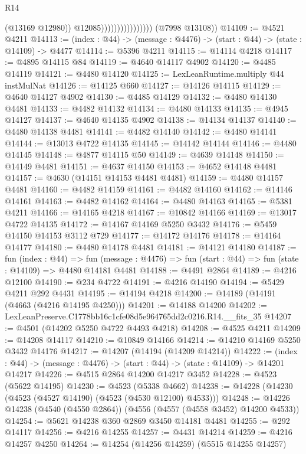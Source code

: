 \begin{lexlean}{R14}
\begin{coremodule}
                                        (@13169 @12980))
                                      @12085))))))))))))))))
      (@7998 @13108))
@14109 := @4521 @4211
@14113 := (index : @44) -> (message : @4476) -> (start : @44) -> (state : @14109) -> @4477
@14114 := @5396 @4211
@14115 := @14114 @4218
@14117 := @4895 @14115 @84
@14119 := @4640 @14117 @4902
@14120 := @4485 @14119
@14121 := @4480 @14120
@14125 := LexLeanRuntime.multiply @44 instMulNat
@14126 := @14125 @660
@14127 := @14126 @14115
@14129 := @4640 @14127 @4902
@14130 := @4485 @14129
@14132 := @4480 @14130 @4481
@14133 := @4482 @14132
@14134 := @4480 @14133
@14135 := @4945 @14127
@14137 := @4640 @14135 @4902
@14138 := @14134 @14137
@14140 := @4480 @14138 @4481
@14141 := @4482 @14140
@14142 := @4480 @14141
@14144 := @13013 @4722 @14135
@14145 := @14142 @14144
@14146 := @4480 @14145
@14148 := @4877 @14115 @50
@14149 := @4639 @14148
@14150 := @14149 @4481
@14151 := @4637 @14150
@14153 := @4652 @14148 @4481
@14157 := @4630 (@14151 @14153 @4481 @4481)
@14159 := @4480 @14157 @4481
@14160 := @4482 @14159
@14161 := @4482 @14160
@14162 := @14146 @14161
@14163 := @4482 @14162
@14164 := @4480 @14163
@14165 := @5381 @4211
@14166 := @14165 @4218
@14167 := @10842 @14166
@14169 := @13017 @4722 @14135
@14172 := @14167 @14169 @5250 @3432
@14176 := @5459 @14150 @14153 @3112 @729
@14177 := @14172 @14176
@14178 := @14164 @14177
@14180 := @4480 @14178 @4481
@14181 := @14121 @14180
@14187 := fun (index : @44) =>
  fun (message : @4476) => fun (start : @44) => fun (state : @14109) => @4480 @14181 @4481
@14188 := @4491 @2864
@14189 := @4216 @12100
@14190 := @234 @4722
@14191 := @4216 @14190
@14194 := @5429 @4211 @292 @4431
@14195 := @14194 @4218
@14200 := @14189 (@14191 (@4663 (@4216 @14195 @4250)))
@14201 := @14188 @14200
@14202 := LexLeanPreserve.C1778bb16c1cfe08d5e964765dd2c0216.R14.__fits_35
@14207 := @4501 (@14202 @5250 @4722 @4493 @4218)
@14208 := @4525 @4211
@14209 := @14208 @14117
@14210 := @10849 @14166
@14214 := @14210 @14169 @5250 @3432 @14176
@14217 := @14207 (@14194 (@14209 @14214))
@14222 := (index : @44) -> (message : @4476) -> (start : @44) -> (state : @14109) -> @14201 @14217
@14226 := @4515 @2864 @14200 @14217 @3452
@14228 := @4523 (@5622 @14195)
@14230 := @4523 (@5338 @4662)
@14238 := @14228 (@14230 (@4523 (@4527 @14190) (@4523 (@4530 @12100) @4533)))
@14248 := @14226 @14238 (@4540 (@4550 @2864)) (@4556 (@4557 (@4558 @3452) @14200 @4533))
@14254 := @5621 @14238 @360 @2869 @3450 @14181 @4481
@14255 := @292 @14117
@14256 := @4216 @14255
@14257 := @4431 @14214
@14259 := @4216 @14257 @4250
@14264 := @14254 (@14256 @14259) (@5515 @14255 @14257)

\end{coremodule}
\end{lexlean}
